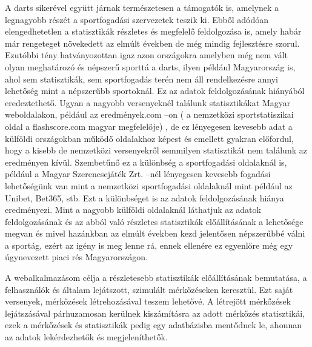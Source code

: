 A darts sikerével együtt járnak természetesen a támogatók is, amelynek a legnagyobb részét 
a sportfogadási szervezetek teszik ki. Ebből adódóan elengedhetetlen a statisztikák részletes 
és megfelelő feldolgozása is, amely habár már rengeteget növekedett az elmúlt években de 
még mindig fejlesztésre szorul. Ezutóbbi tény hatványozottan igaz azon országokra 
amelyben még nem vált olyan meghatározó és népszerű sporttá a darts, ilyen például 
Magyarország is, ahol sem statisztikák, sem sportfogadás terén nem áll rendelkezésre annyi 
lehetőség mint a népszerűbb sportoknál. Ez az adatok feldolgozásának hiányából 
eredeztethető. Ugyan a nagyobb versenyeknél találunk statisztikákat Magyar weboldalakon, 
például az eredmények.com –on ( a nemzetközi sportstatiszikai oldal a flashscore.com 
magyar megfelelője) , de ez lényegesen kevesebb adat a külföldi országokban működő 
oldalakhoz képest és emellett gyakran előfordul, hogy a kisebb de nemzetközi versenyekről 
semmilyen statisztikát nem találunk az eredményen kívül. Szembetűnő ez a különbség a 
sportfogadási oldalaknál is, például a Magyar Szerencsejáték Zrt. –nél lényegesen kevesebb 
fogadási lehetőségünk van mint a nemzetközi sportfogadási oldalaknál mint például az 
Unibet, Bet365, stb. Ezt a különbséget is az adatok feldolgozásának hiánya eredményezi. 
Mint a nagyobb külföldi oldalaknál láthatjuk az adatok feldolgozásának és az abból való 
részletes statisztikák előállításának a lehetősége megvan és mivel hazánkban az elmúlt 
években kezd jelentősen népszerűbbé válni a sportág, ezért az igény is meg lenne rá, ennek 
ellenére  ez egyenlőre még egy úgynevezett piaci rés Magyarországon.

A webalkalmazásom célja a részletesebb statisztikák előállításának bemutatása, a felhasználók és általam lejátszott, szimulált mérkőzéseken keresztül. Ezt saját versenyek, mérkőzések létrehozásával teszem lehetővé. A létrejött mérkőzések lejátszásával párhuzamosan kerülnek kiszámításra az adott mérkőzés statisztikái, ezek a mérkőzések és statisztikák pedig egy adatbázisba mentődnek le, ahonnan az adatok lekérdezhetők és megjeleníthetők.
